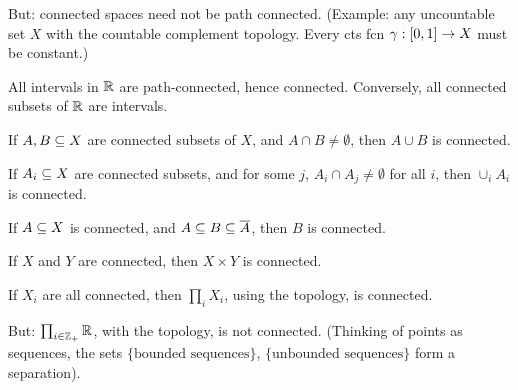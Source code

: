 \documentclass[12pt]{article}
\begin{document}
But: connected spaces need not be path connected. (Example: any uncountable 
set $X$ with the countable complement topology. Every cts fcn $\gamma:[0,1]\rightarrow X$
must be constant.)

All intervals in ${\mathbb R}$ are path-connected, hence connected. Conversely, all connected
subsets of ${\mathbb R}$ are intervals.

If $A,B\subseteq X$ are connected subsets of $X$, and $A\cap B\neq\emptyset$, then 
$A\cup B$ is connected.

If $A_i\subseteq X$ are connected subsets, and for some $j$, $A_i\cap A_j\neq\emptyset$ for all
$i$, then $\cup_i A_i$ is connected.

If $A\subseteq X$ is connected, and $A\subseteq B\subseteq\overline{A}$, then $B$ is connected.

If $X$ and $Y$ are connected, then $X\times Y$ is connected.

If $X_i$ are all connected, then $\prod_i X_i$, using the  topology,
is connected.

But: $\prod_{i\in{\mathbb Z}_+}{\mathbb R}$, with the  topology, is not connected.
(Thinking of points as sequences, the sets $\{\textrm{bounded sequences}\}$,
$\{\textrm{unbounded sequences}\}$ form a separation).












\vfill
\end{document}
